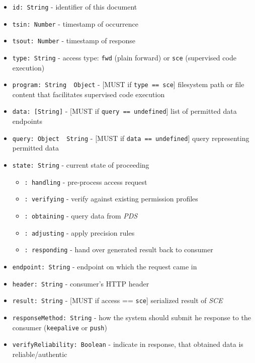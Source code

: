 \documentclass[12pt,english,a4paper,titlepage,cleardoublepage=empty,dottedtoc]{report}
\providecommand{\tightlist}{%
  \setlength{\itemsep}{0pt}\setlength{\parskip}{0pt}}
\begin{document}
\begin{itemize}
\tightlist
\item
  \texttt{id:\ String} - identifier of this document
\item
  \texttt{tsin:\ Number} - timestamp of occurrence
\item
  \texttt{tsout:\ Number} - timestamp of response
\item
  \texttt{type:\ String} - access type: \texttt{fwd} (plain forward) or
  \texttt{sce} (supervised code execution)
\item
  \texttt{program:\ String\ \textbar{}\textbar{}\ Object} - {[}MUST if
  \texttt{type\ ==\ \textquotesingle{}sce\textquotesingle{}}{]}
  filesystem path or file content that facilitates supervised code
  execution
\item
  \texttt{data:\ {[}String{]}} - {[}MUST if
  \texttt{query\ ==\ undefined}{]} list of permitted data endpoints
\item
  \texttt{query:\ Object\ \textbar{}\textbar{}\ String} - {[}MUST if
  \texttt{data\ ==\ undefined}{]} query representing permitted data
\item
  \texttt{state:\ String} - current state of proceeding

  \begin{itemize}
  \tightlist
  \item
    \texttt{:\ \textquotesingle{}handling\textquotesingle{}} -
    pre-process access request
  \item
    \texttt{:\ \textquotesingle{}verifying\textquotesingle{}} - verify
    against existing permission profiles
  \item
    \texttt{:\ \textquotesingle{}obtaining\textquotesingle{}} - query
    data from \emph{PDS}
  \item
    \texttt{:\ \textquotesingle{}adjusting\textquotesingle{}} - apply
    precision rules
  \item
    \texttt{:\ \textquotesingle{}responding\textquotesingle{}} - hand
    over generated result back to consumer
  \end{itemize}
\item
  \texttt{endpoint:\ String} - endpoint on which the request came in
\item
  \texttt{header:\ String} - consumer's HTTP header
\item
  \texttt{result:\ String} - {[}MUST if access ==
  \texttt{\textquotesingle{}sce\textquotesingle{}}{]} serialized result
  of \emph{SCE}
\item
  \texttt{responseMethod:\ String} - how the system should submit he
  response to the consumer (\texttt{keepalive} or \texttt{push})
\item
  \texttt{verifyReliability:\ Boolean} - indicate in response, that
  obtained data is reliable/authentic
\end{itemize}
\end{document}
